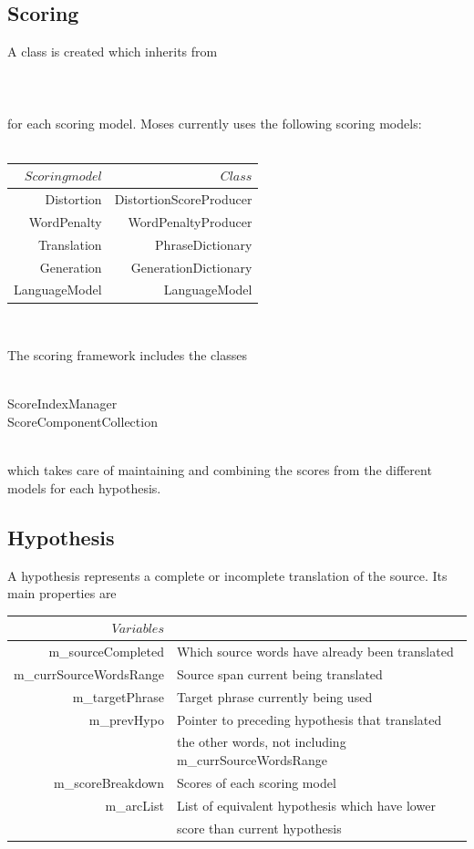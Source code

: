 \documentclass[10pt]{report}
\theoremstyle{plain}
\begin{document}
{\subsection{Scoring}
A class is created which inherits from\\
\\
\\
\\
for each scoring model. Moses currently uses the following scoring models:\\
\\
\begin{center}
\begin{tabular}{|r|r|}
\hline
$ Scoring model $&$ Class $\\
\hline
Distortion	& DistortionScoreProducer\\
WordPenalty	& WordPenaltyProducer\\
Translation	& PhraseDictionary\\
Generation	& GenerationDictionary\\
LanguageModel	& LanguageModel\\
\hline
\end{tabular}\\
\end{center}

The scoring framework includes the classes \\
\\
\begin{tt}
\indent ScoreIndexManager\\
\indent	ScoreComponentCollection\\
\end{tt}
\\
which takes care of maintaining and combining the scores from the different models for each hypothesis.
\subsection{Hypothesis}
A hypothesis represents a complete or incomplete translation of the source. Its main properties are
\begin{center}
\begin{tabular}{|r|l|}
\hline
$ Variables $&$ $\\
\hline
m\_sourceCompleted & Which source words have already been translated\\
m\_currSourceWordsRange & Source span current being translated\\
m\_targetPhrase & Target phrase currently being used\\
m\_prevHypo & Pointer to preceding hypothesis that translated \\
 & the other words, not including m\_currSourceWordsRange\\
m\_scoreBreakdown & Scores of each scoring model\\
m\_arcList & List of equivalent hypothesis which have lower\\
 & score than current hypothesis\\
\hline
\end{tabular}\\
\end{center}

}
\end{document}
